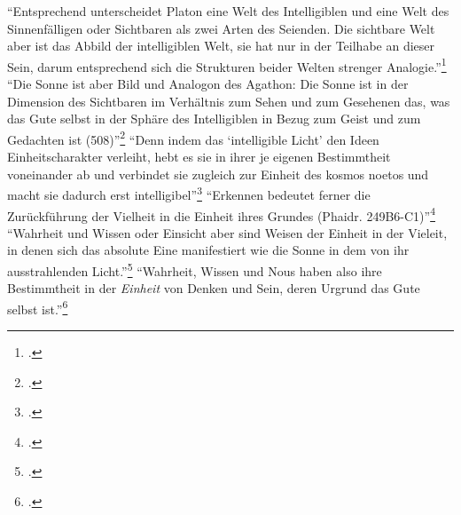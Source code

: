 \enquote{Entsprechend unterscheidet Platon eine Welt des Intelligiblen und eine Welt des Sinnenfälligen oder Sichtbaren als zwei Arten des Seienden. Die sichtbare Welt aber ist das Abbild der intelligiblen Welt, sie hat nur in der Teilhabe an dieser Sein, darum entsprechend sich die Strukturen beider Welten strenger Analogie.}\footcite[][S. 246]{halfwassenaufstieg2006}
\enquote{Die Sonne ist aber Bild und Analogon des Agathon: Die Sonne ist in der Dimension des Sichtbaren im Verhältnis zum Sehen und zum Gesehenen das, was das Gute selbst in der Sphäre des Intelligiblen in Bezug zum Geist und zum Gedachten ist (508)}\footcite[][S. 250]{halfwassenaufstieg2006}
\enquote{Denn indem das \enquote{intelligible Licht} den Ideen Einheitscharakter verleiht, hebt es sie in ihrer je eigenen Bestimmtheit voneinander ab und verbindet sie zugleich zur Einheit des kosmos noetos und macht sie dadurch erst intelligibel}\footcite[][S. 252]{halfwassenaufstieg2006}
\enquote{Erkennen bedeutet ferner die Zurückführung der Vielheit in die Einheit ihres Grundes (Phaidr. 249B6-C1)}\footcite[][S. 252]{halfwassenaufstieg2006}
\enquote{Wahrheit und Wissen oder Einsicht aber sind Weisen der Einheit in der Vieleit, in denen sich das absolute Eine manifestiert wie die Sonne in dem von ihr ausstrahlenden Licht.}\footcite[][S. 252]{halfwassenaufstieg2006}
\enquote{Wahrheit, Wissen und Nous haben also ihre Bestimmtheit in der \emph{Einheit} von Denken und Sein, deren Urgrund das Gute selbst ist.}\footcite[][S. 257]{halfwassenaufstieg2006}


